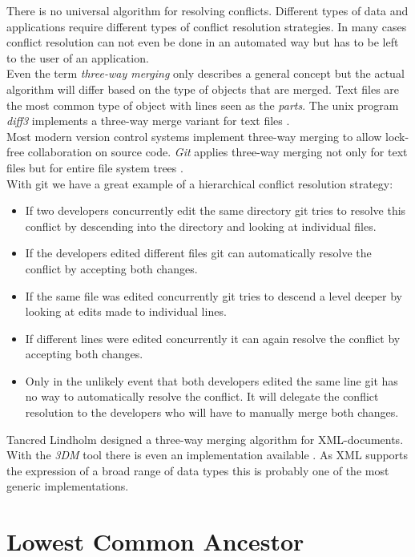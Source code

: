 There is no universal algorithm for resolving conflicts.
Different types of data and applications require different types of conflict resolution strategies.
In many cases conflict resolution can not even be done in an automated way but has to be left to the user of an application.\\
Even the term \emph{three-way merging} only describes a general concept but the actual algorithm will differ based on the type of objects that are merged.
Text files are the most common type of object with lines seen as the \emph{parts}.
The unix program \emph{diff3} implements a three-way merge variant for text files \cite{diff3}.\\
Most modern version control systems implement three-way merging to allow lock-free collaboration on source code.
\emph{Git} applies three-way merging not only for text files but for entire file system trees \cite{git}.\\
With git we have a great example of a hierarchical conflict resolution strategy:

\begin{itemize}
\item If two developers concurrently edit the same directory git tries to resolve this conflict by descending into the directory and looking at individual files.
\item If the developers edited different files git can automatically resolve the conflict by accepting both changes.
\item If the same file was edited concurrently git tries to descend a level deeper by looking at edits made to individual lines.
\item If different lines were edited concurrently it can again resolve the conflict by accepting both changes.
\item Only in the unlikely event that both developers edited the same line git has no way to automatically resolve the conflict.
It will delegate the conflict resolution to the developers who will have to manually merge both changes.
\end{itemize}

Tancred Lindholm designed a three-way merging algorithm for XML-documents.
With the \emph{3DM} tool there is even an implementation available \cite{Lindholm:2001uv}.
As XML supports the expression of a broad range of data types this is probably one of the most generic implementations.

\section{Lowest Common Ancestor}
\label{sec:background.lca}

